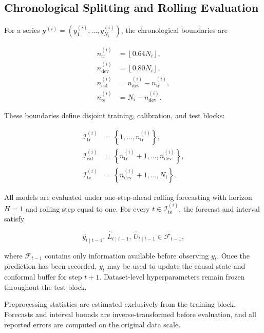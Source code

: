 \documentclass[review,number,sort&compress]{elsarticle}
\begin{document}
\subsection{Chronological Splitting and Rolling Evaluation}
\label{subsec:rolling_protocol}

For a series \(\mathbf{y}^{(i)}=(y^{(i)}_1,\ldots,y^{(i)}_{N_i})\), the chronological boundaries are

\begin{align}
n_{\mathrm{tr}}^{(i)} &= \left\lfloor 0.64N_i\right\rfloor,\\
n_{\mathrm{dev}}^{(i)} &= \left\lfloor 0.80N_i\right\rfloor,\\
n_{\mathrm{cal}}^{(i)} &= n_{\mathrm{dev}}^{(i)}-n_{\mathrm{tr}}^{(i)},\\
n_{\mathrm{te}}^{(i)} &= N_i-n_{\mathrm{dev}}^{(i)}.
\end{align}

These boundaries define disjoint training, calibration, and test blocks:

\begin{align}
\mathcal{I}_{\mathrm{tr}}^{(i)}
&=
\left\{1,\ldots,n_{\mathrm{tr}}^{(i)}\right\},\\
\mathcal{I}_{\mathrm{cal}}^{(i)}
&=
\left\{n_{\mathrm{tr}}^{(i)}+1,\ldots,
n_{\mathrm{dev}}^{(i)}\right\},\\
\mathcal{I}_{\mathrm{te}}^{(i)}
&=
\left\{n_{\mathrm{dev}}^{(i)}+1,\ldots,N_i\right\}.
\end{align}

All models are evaluated under one-step-ahead rolling forecasting with horizon \(H=1\) and rolling step equal to one. For every \(t\in\mathcal{I}_{\mathrm{te}}^{(i)}\), the forecast and interval satisfy

\begin{equation}
\widehat{y}_{t\mid t-1},\,
\widehat{L}_{t\mid t-1},\,
\widehat{U}_{t\mid t-1}
\in\mathcal{F}_{t-1},
\label{eq:causal_forecast}
\end{equation}

where \(\mathcal{F}_{t-1}\) contains only information available before observing \(y_t\). Once the prediction has been recorded, \(y_t\) may be used to update the causal state and conformal buffer for step \(t+1\). Dataset-level hyperparameters remain frozen throughout the test block.

Preprocessing statistics are estimated exclusively from the training block. Forecasts and interval bounds are inverse-transformed before evaluation, and all reported errors are computed on the original data scale.
\end{document}
